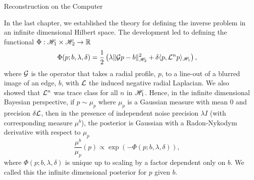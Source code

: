 \setlength{\parindent}{2ex}
\newcommand{\Ab}{{\bf A}}
\newcommand{\N}{\mathcal{N}}
\begin{chapter}{Reconstruction on the Computer}\label{chapter:computational}

In the last chapter, we established the theory for defining the inverse problem in an infinite dimensional Hilbert space. 
The development led to defining the functional $\Phi:\mathscr H_1 \times \mathscr H_2 \to \mathbb R$
\begin{equation} \label{eq:regularizingFunctional}
  \Phi(p; b,\lambda,\delta) = \frac 12 \left(\lambda\|\mathcal G p - b\|_{\mathscr H_2}^2 + \delta\langle p, \mathcal L^n p\rangle_{\mathscr H_1}\right),
\end{equation}
where $\mathcal G$ is the operator that takes a radial profile, $p$, to a line-out of a blurred image of an edge, $b$, with $\mathcal L$ the induced negative radial Laplacian. 
We also showed that $\mathcal L^n$ was trace class for all $n$ in $\mathscr H_1$. %
Hence, in the infinite dimensional Bayesian perspective, if $p\sim \mu_p$ where $\mu_p$ is a Gaussian measure with mean $0$ and precision $\delta \mathcal L$, then in the presence of independent noise precision $\lambda I$ (with corresponding measure $\mu^b$), the posterior is Gaussian with a Radon-Nykodym derivative with respect to $\mu_p$
\begin{equation} \label{eq:posteriorInfinite}
  \frac{\mu^b}{\mu_p}(p) \propto \exp\left(-\Phi(p;b,\lambda,\delta)\right),
\end{equation}
where $\Phi(p;b,\lambda,\delta)$ is unique up to scaling by a factor dependent only on $b$.
We called this the infinite dimensional posterior for $p$ given $b$.


\end{chapter}
